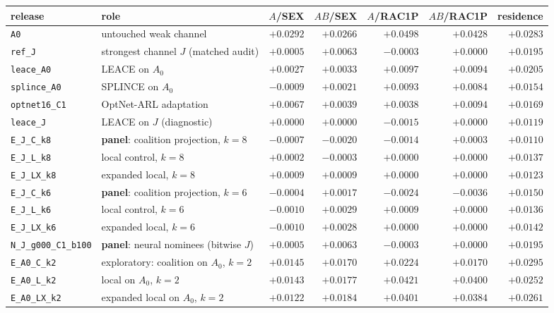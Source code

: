 \begin{tabular}{@{}l l r r r r r@{}}
\toprule
release & role & $A$/SEX & $AB$/SEX & $A$/RAC1P & $AB$/RAC1P & residence \\
\midrule
\texttt{A0} & untouched weak channel & $+0.0292$ & $+0.0266$ & $+0.0498$ & $+0.0428$ & $+0.0283$ \\
\texttt{ref\_J} & strongest channel $J$ (matched audit) & $+0.0005$ & $+0.0063$ & $-0.0003$ & $+0.0000$ & $+0.0195$ \\
\texttt{leace\_A0} & LEACE on $A_0$ & $+0.0027$ & $+0.0033$ & $+0.0097$ & $+0.0094$ & $+0.0205$ \\
\texttt{splince\_A0} & SPLINCE on $A_0$ & $-0.0009$ & $+0.0021$ & $+0.0093$ & $+0.0084$ & $+0.0154$ \\
\texttt{optnet16\_C1} & OptNet-ARL adaptation & $+0.0067$ & $+0.0039$ & $+0.0038$ & $+0.0094$ & $+0.0169$ \\
\texttt{leace\_J} & LEACE on $J$ (diagnostic) & $+0.0000$ & $+0.0000$ & $-0.0015$ & $+0.0000$ & $+0.0119$ \\
\midrule
\texttt{E\_J\_C\_k8} & \textbf{panel}: coalition projection, $k{=}8$ & $-0.0007$ & $-0.0020$ & $-0.0014$ & $+0.0003$ & $+0.0110$ \\
\texttt{E\_J\_L\_k8} & local control, $k{=}8$ & $+0.0002$ & $-0.0003$ & $+0.0000$ & $+0.0000$ & $+0.0137$ \\
\texttt{E\_J\_LX\_k8} & expanded local, $k{=}8$ & $+0.0009$ & $+0.0009$ & $+0.0000$ & $+0.0000$ & $+0.0123$ \\
\texttt{E\_J\_C\_k6} & \textbf{panel}: coalition projection, $k{=}6$ & $-0.0004$ & $+0.0017$ & $-0.0024$ & $-0.0036$ & $+0.0150$ \\
\texttt{E\_J\_L\_k6} & local control, $k{=}6$ & $-0.0010$ & $+0.0029$ & $+0.0009$ & $+0.0000$ & $+0.0136$ \\
\texttt{E\_J\_LX\_k6} & expanded local, $k{=}6$ & $-0.0010$ & $+0.0028$ & $+0.0000$ & $+0.0000$ & $+0.0142$ \\
\texttt{N\_J\_g000\_C1\_b100} & \textbf{panel}: neural nominees (bitwise $J$) & $+0.0005$ & $+0.0063$ & $-0.0003$ & $+0.0000$ & $+0.0195$ \\
\midrule
\texttt{E\_A0\_C\_k2} & exploratory: coalition on $A_0$, $k{=}2$ & $+0.0145$ & $+0.0170$ & $+0.0224$ & $+0.0170$ & $+0.0295$ \\
\texttt{E\_A0\_L\_k2} & local on $A_0$, $k{=}2$ & $+0.0143$ & $+0.0177$ & $+0.0421$ & $+0.0400$ & $+0.0252$ \\
\texttt{E\_A0\_LX\_k2} & expanded local on $A_0$, $k{=}2$ & $+0.0122$ & $+0.0184$ & $+0.0401$ & $+0.0384$ & $+0.0261$ \\
\bottomrule
\end{tabular}
